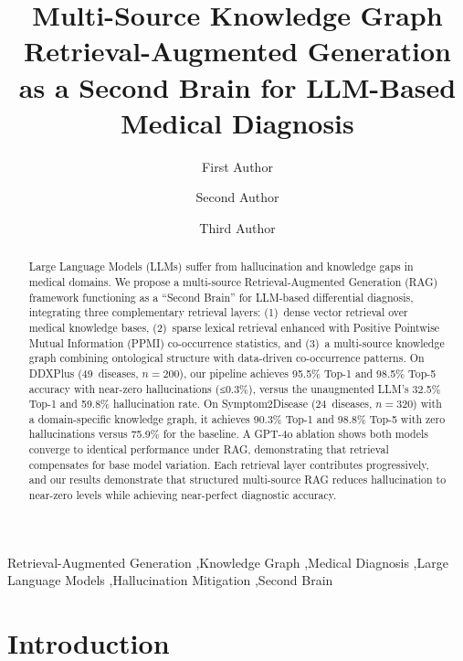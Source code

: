 \documentclass[preprint,12pt]{elsarticle}
\begin{document}
\begin{frontmatter}

\title{Multi-Source Knowledge Graph Retrieval-Augmented Generation\\as a Second Brain for LLM-Based Medical Diagnosis}

\author[addr1]{First Author}
\author[addr1]{Second Author}
\author[addr1]{Third Author}

\address[addr1]{Department of Computer Science, University, Country}

\begin{abstract}
Large Language Models (LLMs) suffer from hallucination and knowledge gaps in medical domains. We propose a multi-source Retrieval-Augmented Generation (RAG) framework functioning as a ``Second Brain'' for LLM-based differential diagnosis, integrating three complementary retrieval layers: (1)~dense vector retrieval over medical knowledge bases, (2)~sparse lexical retrieval enhanced with Positive Pointwise Mutual Information (PPMI) co-occurrence statistics, and (3)~a multi-source knowledge graph combining ontological structure with data-driven co-occurrence patterns. On DDXPlus (49~diseases, $n{=}200$), our pipeline achieves 95.5\% Top-1 and 98.5\% Top-5 accuracy with near-zero hallucinations (≤0.3\%), versus the unaugmented LLM's 32.5\% Top-1 and 59.8\% hallucination rate. On Symptom2Disease (24~diseases, $n{=}320$) with a domain-specific knowledge graph, it achieves 90.3\% Top-1 and 98.8\% Top-5 with zero hallucinations versus 75.9\% for the baseline. A GPT-4o ablation shows both models converge to identical performance under RAG, demonstrating that retrieval compensates for base model variation. Each retrieval layer contributes progressively, and our results demonstrate that structured multi-source RAG reduces hallucination to near-zero levels while achieving near-perfect diagnostic accuracy.
\end{abstract}

\begin{keyword}
Retrieval-Augmented Generation \sep Knowledge Graph \sep Medical Diagnosis \sep Large Language Models \sep Hallucination Mitigation \sep Second Brain
\end{keyword}

\end{frontmatter}

\section{Introduction}
\label{sec:introduction}
\end{document}
